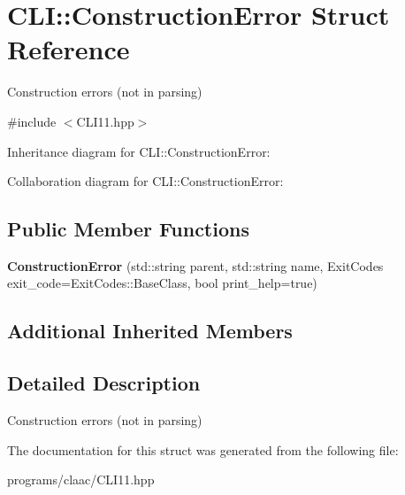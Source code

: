 \hypertarget{struct_c_l_i_1_1_construction_error}{}\section{C\+LI\+:\+:Construction\+Error Struct Reference}
\label{struct_c_l_i_1_1_construction_error}


Construction errors (not in parsing)  




{\ttfamily \#include $<$C\+L\+I11.\+hpp$>$}



Inheritance diagram for C\+LI\+:\+:Construction\+Error\+:


Collaboration diagram for C\+LI\+:\+:Construction\+Error\+:
\subsection*{Public Member Functions}
\begin{DoxyCompactItemize}
\item 
\mbox{\label{struct_c_l_i_1_1_construction_error_affb7ef6f314c46ba10c875bbfc4f68a1}} 
{\bfseries Construction\+Error} (std\+::string parent, std\+::string name, Exit\+Codes exit\+\_\+code=Exit\+Codes\+::\+Base\+Class, bool print\+\_\+help=true)
\end{DoxyCompactItemize}
\subsection*{Additional Inherited Members}


\subsection{Detailed Description}
Construction errors (not in parsing) 

The documentation for this struct was generated from the following file\+:\begin{DoxyCompactItemize}
\item 
programs/claac/C\+L\+I11.\+hpp\end{DoxyCompactItemize}
